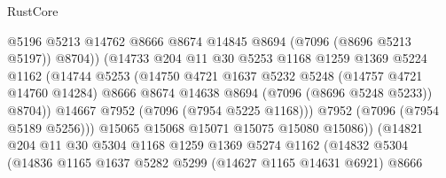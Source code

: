 \begin{lexlean}{RustCore}
\begin{coremodule}
                                    @5196
                                    @5213
                                    @14762
                                    @8666
                                    @8674
                                    @14845
                                    @8694
                                    (@7096 (@8696 @5213 @5197))
                                    @8704))
                                (@14733
                                  @204
                                  @11
                                  @30
                                  @5253
                                  @1168
                                  @1259
                                  @1369
                                  @5224
                                  @1162
                                  (@14744
                                    @5253
                                    (@14750
                                      @4721
                                      @1637
                                      @5232
                                      @5248
                                      (@14757 @4721 @14760 @14284)
                                      @8666
                                      @8674
                                      @14638
                                      @8694
                                      (@7096 (@8696 @5248 @5233))
                                      @8704))
                                  @14667
                                  @7952
                                  (@7096 (@7954 @5225 @1168)))
                                @7952
                                (@7096 (@7954 @5189 @5256)))
                              @15065
                              @15068
                              @15071
                              @15075
                              @15080
                              @15086))
                          (@14821
                            @204
                            @11
                            @30
                            @5304
                            @1168
                            @1259
                            @1369
                            @5274
                            @1162
                            (@14832
                              @5304
                              (@14836
                                @1165
                                @1637
                                @5282
                                @5299
                                (@14627 @1165 @14631 @6921)
                                @8666

\end{coremodule}
\end{lexlean}
